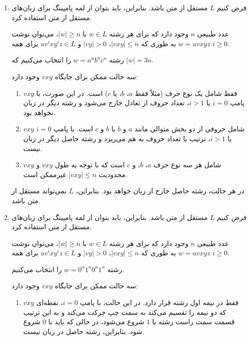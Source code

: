 \begin{enumerate}
	\item 
	فرض کنیم \( L \) مستقل از متن باشد. بنابراین، باید بتوان از لمه پامپینگ برای زبان‌های مستقل از متن استفاده کرد.
	
	عدد طبیعی \( n \) وجود دارد که برای هر رشته \( w \in L \) با \( |w| \geq n \)، می‌توان نوشت \( w = uvxyz \) به طوری که \( |vxy| \leq n \)، \( |vy| > 0 \) و \( uv^i xy^i z \in L \) برای همه \( i \geq 0 \).
	
	رشته \( w = a^n b^n c^n \) را انتخاب می‌کنیم که \( |w| = 3n \).
	
	سه حالت ممکن برای جایگاه \( vxy \) وجود دارد:
	
	\begin{enumerate}
		\item \( vxy \) فقط شامل یک نوع حرف (مثلاً فقط \( a \)، \( b \)، یا \( c \)) است. در این صورت، با پامپ \( i = 0 \) یا \( i > 1 \)، تعداد حروف از تعادل خارج می‌شود و رشته دیگر در زبان نخواهد بود.
		\item \( vxy \) شامل حروفی از دو بخش متوالی مانند \( a \) و \( b \) یا \( b \) و \( c \) است. با پامپ \( i = 0 \) یا \( i > 1 \)، ترتیب یا تعداد حروف به هم می‌ریزد و رشته حاصل دیگر در زبان نیست.
		\item \( vxy \) شامل هر سه نوع حرف \( a \)، \( b \)، و \( c \) است که با توجه به طول \( vxy \) و محدودیت \( |vxy| \leq n \) غیرممکن است.
	\end{enumerate}
	
	در هر حالت، رشته حاصل خارج از زبان خواهد بود. بنابراین، \( L \) نمی‌تواند مستقل از متن باشد.
	
	\item 
	فرض کنیم \( L \) مستقل از متن باشد. بنابراین، باید بتوان از لمه پامپینگ برای زبان‌های مستقل از متن استفاده کرد.
	
	عدد طبیعی \( n \) وجود دارد که برای هر رشته \( w \in L \) با \( |w| \geq n \)، می‌توان نوشت \( w = uvxyz \) به طوری که \( |vxy| \leq n \)، \( |vy| > 0 \) و \( uv^i xy^i z \in L \) برای همه \( i \geq 0 \).
	
	رشته \( w = 0^n 1^n 0^n 1^n \) را انتخاب می‌کنیم.
	
	سه حالت ممکن برای جایگاه \( vxy \) وجود دارد:
	
	\begin{enumerate}
		\item \( vxy \) فقط در نیمه اول رشته قرار دارد. در این حالت، با پامپ \( i = 0 \)، نقطه‌ای که دو نیمه را تقسیم می‌کند به سمت چپ حرکت می‌کند و به این ترتیب قسمت سمت راست رشته با \( 1 \) شروع می‌شود، در حالی که باید با \( 0 \) شروع شود. بنابراین، رشته حاصل در زبان نیست.
		

\end{enumerate}
\end{enumerate}

